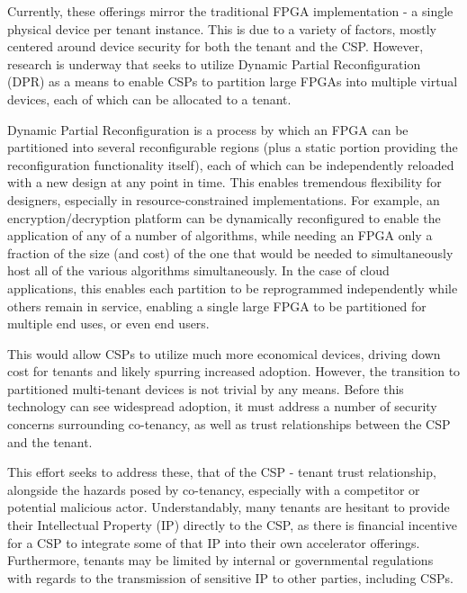 Currently, these offerings mirror the traditional FPGA implementation - a single physical device per tenant instance. This is due to a variety of factors, mostly centered around device security for both the tenant and the CSP. However, research is underway that seeks to utilize Dynamic Partial Reconfiguration (DPR) as a means to enable CSPs to partition large FPGAs into multiple virtual devices, each of which can be allocated to a tenant. 

Dynamic Partial Reconfiguration is a process by which an FPGA can be partitioned into several reconfigurable regions (plus a static portion providing the reconfiguration functionality itself), each of which can be independently reloaded with a new design at any point in time. This enables tremendous flexibility for designers, especially in resource-constrained implementations. For example, an encryption/decryption platform can be dynamically reconfigured to enable the application of any of a number of algorithms, while needing an FPGA only a fraction of the size (and cost) of the one that would be needed to simultaneously host all of the various algorithms simultaneously. In the case of cloud applications, this enables each partition to be reprogrammed independently while others remain in service, enabling a single large FPGA to be partitioned for multiple end uses, or even end users.

This would allow CSPs to utilize much more economical devices, driving down cost for tenants and likely spurring increased adoption. However, the transition to partitioned multi-tenant devices is not trivial by any means. Before this technology can see widespread adoption, it must address a number of security concerns surrounding co-tenancy, as well as trust relationships between the CSP and the tenant.

This effort seeks to address these, that of the CSP - tenant trust relationship, alongside the hazards posed by co-tenancy, especially with a competitor or potential malicious actor. Understandably, many tenants are hesitant to provide their Intellectual Property (IP) directly to the CSP, as there is financial incentive for a CSP to integrate some of that IP into their own accelerator offerings. Furthermore, tenants may be limited by internal or governmental regulations with regards to the transmission of sensitive IP to other parties, including CSPs. 

